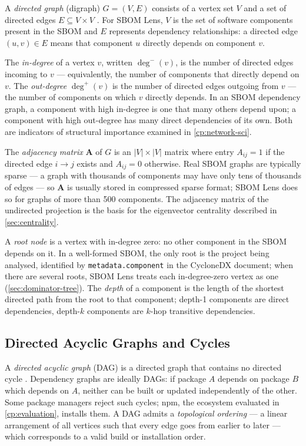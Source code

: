 A \textit{directed graph} (digraph) \(G = (V, E)\) consists of a vertex set \(V\) and a set of directed edges \(E \subseteq V \times V\) \citep{CLRS4th}. For SBOM Lens, \(V\) is the set of software components present in the SBOM and \(E\) represents dependency relationships: a directed edge \((u, v) \in E\) means that component \(u\) directly depends on component \(v\).

The \textit{in-degree} of a vertex \(v\), written \(\deg^-(v)\), is the number of directed edges incoming to \(v\) --- equivalently, the number of components that directly depend on \(v\). The \textit{out-degree} \(\deg^+(v)\) is the number of directed edges outgoing from \(v\) --- the number of components on which \(v\) directly depends. In an SBOM dependency graph, a component with high in-degree is one that many others depend upon; a component with high out-degree has many direct dependencies of its own. Both are indicators of structural importance examined in \autoref{cp:network-sci}.

The \textit{adjacency matrix} \(\mathbf{A}\) of \(G\) is an \(|V| \times |V|\) matrix where entry \(A_{ij} = 1\) if the directed edge \(i \to j\) exists and \(A_{ij} = 0\) otherwise. Real SBOM graphs are typically sparse --- a graph with thousands of components may have only tens of thousands of edges --- so \(\mathbf{A}\) is usually stored in compressed sparse format; SBOM Lens does so for graphs of more than 500 components. The adjacency matrix of the undirected projection is the basis for the eigenvector centrality described in \autoref{sec:centrality}.

A \textit{root node} is a vertex with in-degree zero: no other component in the SBOM depends on it. In a well-formed SBOM, the only root is the project being analysed, identified by \texttt{metadata.component} in the CycloneDX document; when there are several roots, SBOM Lens treats each in-degree-zero vertex as one (\autoref{sec:dominator-tree}). The \textit{depth} of a component is the length of the shortest directed path from the root to that component; depth-1 components are direct dependencies, depth-\(k\) components are \(k\)-hop transitive dependencies.


\subsection{Directed Acyclic Graphs and Cycles}
\label{sec:dags}

A \textit{directed acyclic graph} (DAG) is a directed graph that contains no directed cycle \citep{CLRS4th}. Dependency graphs are ideally DAGs: if package \(A\) depends on package \(B\) which depends on \(A\), neither can be built or updated independently of the other. Some package managers reject such cycles; npm, the ecosystem evaluated in \autoref{cp:evaluation}, installs them. A DAG admits a \textit{topological ordering} --- a linear arrangement of all vertices such that every edge goes from earlier to later --- which corresponds to a valid build or installation order.

